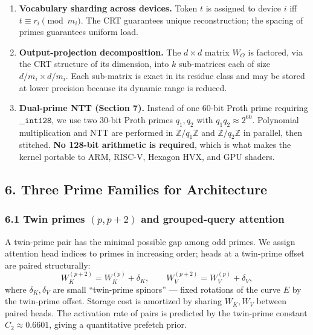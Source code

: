 \documentclass[
  11pt,
]{article}
\begin{document}
\begin{enumerate}
\def\labelenumi{\arabic{enumi}.}
\item
  \textbf{Vocabulary sharding across devices.} Token \(t\) is assigned
  to device \(i\) iff \(t \equiv r_i \pmod{m_i}\). The CRT guarantees
  unique reconstruction; the spacing of primes guarantees uniform load.
\item
  \textbf{Output-projection decomposition.} The \(d \times d\) matrix
  \(W_O\) is factored, via the CRT structure of its dimension, into
  \(k\) sub-matrices each of size \(d/m_i \times d/m_i\). Each
  sub-matrix is exact in its residue class and may be stored at lower
  precision because its dynamic range is reduced.
\item
  \textbf{Dual-prime NTT (Section 7).} Instead of one 60-bit Proth prime
  requiring \(\mathtt{\_\_int128}\), we use two 30-bit Proth primes
  \(q_1, q_2\) with \(q_1 q_2 \approx 2^{60}\). Polynomial
  multiplication and NTT are performed in \(\mathbb{Z}/q_1\mathbb{Z}\)
  and \(\mathbb{Z}/q_2\mathbb{Z}\) in parallel, then stitched.
  \textbf{No 128-bit arithmetic is required}, which is what makes the
  kernel portable to ARM, RISC-V, Hexagon HVX, and GPU shaders.
\end{enumerate}

\hypertarget{three-prime-families-for-architecture}{%
\subsection{6. Three Prime Families for
Architecture}\label{three-prime-families-for-architecture}}

\hypertarget{twin-primes-p-p2-and-grouped-query-attention}{%
\subsubsection{\texorpdfstring{6.1 Twin primes \((p, p+2)\) and
grouped-query
attention}{6.1 Twin primes (p, p+2) and grouped-query attention}}\label{twin-primes-p-p2-and-grouped-query-attention}}

A twin-prime pair has the minimal possible gap among odd primes. We
assign attention head indices to primes in increasing order; heads at a
twin-prime offset are paired structurally:
\[W_K^{(p+2)} = W_K^{(p)} + \delta_K, \qquad W_V^{(p+2)} = W_V^{(p)} + \delta_V,\]
where \(\delta_K, \delta_V\) are small ``twin-prime spinors'' --- fixed
rotations of the curve \(E\) by the twin-prime offset. Storage cost is
amortized by sharing \(W_K, W_V\) between paired heads. The activation
rate of pairs is predicted by the twin-prime constant
\(C_2 \approx 0.6601\), giving a quantitative prefetch prior.
\end{document}
